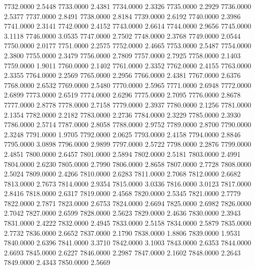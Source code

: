 7732.0000      2.5448
7733.0000      2.4381
7734.0000      2.3326
7735.0000      2.2929
7736.0000      2.5377
7737.0000      2.8491
7738.0000      2.8184
7739.0000      2.6192
7740.0000      2.3986
7741.0000      2.3141
7742.0000      2.4152
7743.0000      2.6614
7744.0000      2.9656
7745.0000      3.1118
7746.0000      3.0535
7747.0000      2.7502
7748.0000      2.3768
7749.0000      2.0544
7750.0000      2.0177
7751.0000      2.2575
7752.0000      2.4665
7753.0000      2.5487
7754.0000      2.3800
7755.0000      2.3479
7756.0000      2.7809
7757.0000      2.7925
7758.0000      2.1403
7759.0000      1.9011
7760.0000      2.1402
7761.0000      2.3352
7762.0000      2.4155
7763.0000      2.3355
7764.0000      2.2569
7765.0000      2.2956
7766.0000      2.4381
7767.0000      2.6376
7768.0000      2.6532
7769.0000      2.5480
7770.0000      2.5965
7771.0000      2.6948
7772.0000      2.6899
7773.0000      2.6519
7774.0000      2.6296
7775.0000      2.7095
7776.0000      2.8678
7777.0000      2.8778
7778.0000      2.7158
7779.0000      2.3937
7780.0000      2.1256
7781.0000      2.1354
7782.0000      2.2182
7783.0000      2.2736
7784.0000      2.3229
7785.0000      2.3930
7786.0000      2.5714
7787.0000      2.8058
7788.0000      2.9752
7789.0000      2.8700
7790.0000      2.3248
7791.0000      1.9705
7792.0000      2.0625
7793.0000      2.4158
7794.0000      2.8846
7795.0000      3.0898
7796.0000      2.9899
7797.0000      2.5722
7798.0000      2.2876
7799.0000      2.4851
7800.0000      2.6457
7801.0000      2.5894
7802.0000      2.5181
7803.0000      2.4991
7804.0000      2.6230
7805.0000      2.7990
7806.0000      2.8658
7807.0000      2.7728
7808.0000      2.5024
7809.0000      2.4266
7810.0000      2.6283
7811.0000      2.7068
7812.0000      2.6682
7813.0000      2.7673
7814.0000      2.9354
7815.0000      3.0336
7816.0000      3.0123
7817.0000      2.8416
7818.0000      2.6317
7819.0000      2.4568
7820.0000      2.5345
7821.0000      2.7779
7822.0000      2.7871
7823.0000      2.6753
7824.0000      2.6694
7825.0000      2.6982
7826.0000      2.7042
7827.0000      2.6599
7828.0000      2.5623
7829.0000      2.4636
7830.0000      2.3943
7831.0000      2.4222
7832.0000      2.4945
7833.0000      2.5158
7834.0000      2.5879
7835.0000      2.7732
7836.0000      2.6652
7837.0000      2.1790
7838.0000      1.8806
7839.0000      1.9531
7840.0000      2.6396
7841.0000      3.3710
7842.0000      3.1003
7843.0000      2.6353
7844.0000      2.6693
7845.0000      2.6227
7846.0000      2.2987
7847.0000      2.1602
7848.0000      2.2643
7849.0000      2.4343
7850.0000      2.5669
